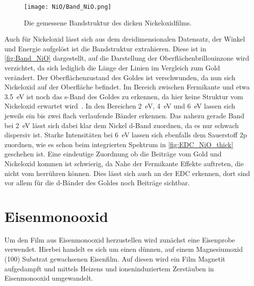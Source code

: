         \begin{figure}
            \centering
            \texttt{[image: NiO/Band\_NiO.png]}
            \caption{Die gemessene Bandstruktur des dicken Nickeloxidfilms.}
            \label{fig:Band_NiO}
        \end{figure}
        Auch für Nickeloxid lässt sich aus dem dreidimensionalen Datensatz, der Winkel und Energie aufgelöst ist die Bandstruktur extrahieren.
        Diese ist in \autoref{fig:Band_NiO} dargestellt, auf die Darstellung der Oberflächenbrillouinzone wird verzichtet, da sich lediglich die Länge der Linien im Vergleich zum Gold verändert.
        Der Oberflächenzustand des Goldes ist verschwunden, da nun sich Nickeloxid auf der Oberfläche befindet.
        Im Bereich zwischen Fermikante und etwa \SI{3.5}{\electronvolt} ist noch das s-Band des Goldes zu erkennen, da hier keine Struktur vom Nickeloxid erwartet wird~\cite{NiO_12}.
        In den Bereichen \SI{2}{\electronvolt}, \SI{4}{\electronvolt} und \SI{6}{\electronvolt} lassen sich jeweils ein bis zwei flach verlaufende Bänder erkennen.
        Das nahezu gerade Band bei \SI{2}{\electronvolt} lässt sich dabei klar dem Nickel d-Band zuordnen, da es nur schwach dispersiv ist.
        Starke Intensitäten bei \SI{6}{\electronvolt} lassen sich ebenfalls dem Sauerstoff 2p zuordnen, wie es schon beim integrierten Spektrum in \autoref{fig:EDC_NiO_thick} geschehen ist.
        Eine eindeutige Zuordnung ob die Beiträge vom Gold und Nickeloxid kommen ist schwierig, da Nahe der Fermikante Effekte auftreten, die nicht vom  herrühren können.
        Dies lässt sich auch an der EDC erkennen, dort sind vor allem für die d-Bänder des Goldes noch Beiträge sichtbar.
        
    \FloatBarrier
    \section{Eisenmonooxid} \label{sec:Prep_FeO}
        Um den Film aus Eisenmonooxid herzustellen wird zunächst eine Eisenprobe verwendet.
        Hierbei handelt es sich um einen dünnen, auf einem Magnesiumoxid (100) Substrat gewachsenen Eisenfilm.
        Auf diesen wird ein Film Magnetit aufgedampft und mittels Heizens und ioneninduziertem Zerstäuben in Eisenmonooxid umgewandelt.

